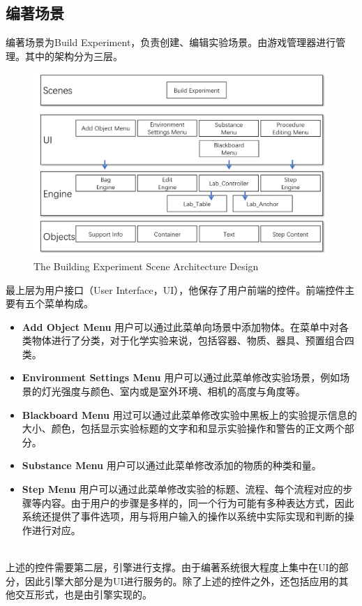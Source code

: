 \subsection{编著场景}
编著场景为Build Experiment，负责创建、编辑实验场景。由游戏管理器进行管理。其中的架构分为三层。

\begin{figure}[!htp]
  \centering
  \includegraphics[width=12cm]{figure/buildearc.png}
    {The Building Experiment Scene Architecture Design}
 \label{fig:gm}
\end{figure}

最上层为用户接口（User Interface，UI），他保存了用户前端的控件。前端控件主要有五个菜单构成。

\begin{itemize}
    \item \textbf{Add Object Menu}
用户可以通过此菜单向场景中添加物体。在菜单中对各类物体进行了分类，对于化学实验来说，包括容器、物质、器具、预置组合四类。
    
    \item \textbf{Environment Settings Menu}
用户可以通过此菜单修改实验场景，例如场景的灯光强度与颜色、室内或是室外环境、相机的高度与角度等。
    
    \item \textbf{Blackboard Menu}
用过可以通过此菜单修改实验中黑板上的实验提示信息的大小、颜色，包括显示实验标题的文字和和显示实验操作和警告的正文两个部分。

    \item \textbf{Substance Menu}
用户可以通过此菜单修改添加的物质的种类和量。

    \item \textbf{Step Menu}
用户可以通过此菜单修改实验的标题、流程、每个流程对应的步骤等内容。由于用户的步骤是多样的，同一个行为可能有多种表达方式，因此系统还提供了事件选项，用与将用户输入的操作以系统中实际实现和判断的操作进行对应。

\end{itemize}
~\\
\indent    	上述的控件需要第二层，引擎进行支撑。由于编著系统很大程度上集中在UI的部分，因此引擎大部分是为UI进行服务的。除了上述的控件之外，还包括应用的其他交互形式，也是由引擎实现的。

